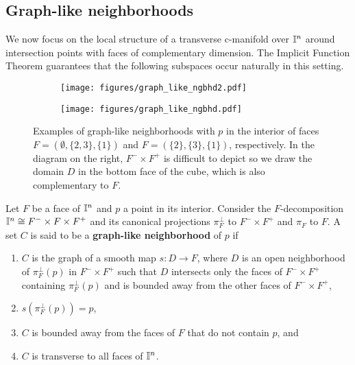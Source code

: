 \subsection{Graph-like neighborhoods}

We now focus on the local structure of a transverse c-manifold over $\mathbb{I}^n$ around intersection points with faces of complementary dimension.
The Implicit Function Theorem guarantees that the following subspaces occur naturally in this setting.

\begin{figure}[!h]
	\centering
	\begin{subfigure}{.32\textwidth}
		\texttt{[image: figures/graph\_like\_ngbhd2.pdf]}
		\hfill
	\end{subfigure}
	\begin{subfigure}{.32\textwidth}
		\hfill
		\texttt{[image: figures/graph\_like\_ngbhd.pdf]}
	\end{subfigure}
	\caption{Examples of graph-like neighborhoods with $p$ in the interior of faces $F=(\emptyset, \{2,3\}, \{1\})$ and $F=(\{2\}, \{3\}, \{1\})$, respectively. In the diagram on the right, $F^-\times F^+$ is difficult to depict so we draw the domain $D$ in the bottom face of the cube, which is also complementary to $F$. }
	\label{F: graph like neighborhood}
\end{figure}

\begin{definition}\label{D: graph-like}
	Let $F$ be a face of $\mathbb{I}^n$ and $p$ a point in its interior.
	Consider the $F$-decomposition $\mathbb{I}^n \cong F^- \times F \times F^+$ and its canonical projections $\pi_F^{\perp}$ to $F^- \times F^+$ and $\pi_F$ to $F$.
	A set $C$ is said to be a \textbf{graph-like neighborhood} of $p$ if
	\begin{enumerate}
		\item $C$ is the graph of a smooth map $s: D \to F$, where $D$ is an open neighborhood of $\pi_F^\perp(p)$ in $F^- \times F^+$ such that $D$ intersects only the faces of $F^- \times F^+$ containing $\pi_F^\perp(p)$ and is bounded away from the other faces of $F^- \times F^+$,

		\item $s(\pi_F^\perp(p)) = p$,

		\item $C$ is bounded away from the faces of $F$ that do not contain $p$, and

		\item $C$ is transverse to all faces of $\mathbb{I}^n$.
	\end{enumerate}
\end{definition}

